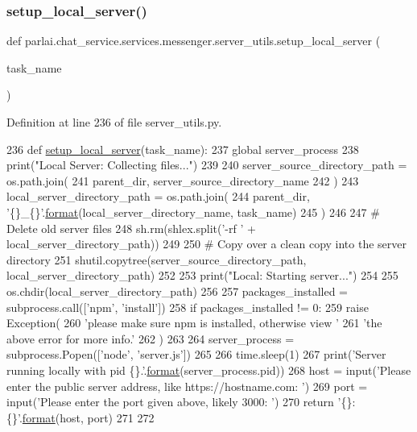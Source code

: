 \subsubsection{\texorpdfstring{setup\+\_\+local\+\_\+server()}{setup\_local\_server()}}
{\footnotesize\ttfamily def parlai.\+chat\+\_\+service.\+services.\+messenger.\+server\+\_\+utils.\+setup\+\_\+local\+\_\+server (\begin{DoxyParamCaption}\item[{}]{task\+\_\+name }\end{DoxyParamCaption})}



Definition at line 236 of file server\+\_\+utils.\+py.


\begin{DoxyCode}
236 \textcolor{keyword}{def }\hyperlink{namespaceparlai_1_1mturk_1_1core_1_1server__utils_a9d4c4937ea60bd74630a44739e825ebf}{setup\_local\_server}(task\_name):
237     \textcolor{keyword}{global} server\_process
238     print(\textcolor{stringliteral}{"Local Server: Collecting files..."})
239 
240     server\_source\_directory\_path = os.path.join(
241         parent\_dir, server\_source\_directory\_name
242     )
243     local\_server\_directory\_path = os.path.join(
244         parent\_dir, \textcolor{stringliteral}{'\{\}\_\{\}'}.\hyperlink{namespaceparlai_1_1chat__service_1_1services_1_1messenger_1_1shared__utils_a32e2e2022b824fbaf80c747160b52a76}{format}(local\_server\_directory\_name, task\_name)
245     )
246 
247     \textcolor{comment}{# Delete old server files}
248     sh.rm(shlex.split(\textcolor{stringliteral}{'-rf '} + local\_server\_directory\_path))
249 
250     \textcolor{comment}{# Copy over a clean copy into the server directory}
251     shutil.copytree(server\_source\_directory\_path, local\_server\_directory\_path)
252 
253     print(\textcolor{stringliteral}{"Local: Starting server..."})
254 
255     os.chdir(local\_server\_directory\_path)
256 
257     packages\_installed = subprocess.call([\textcolor{stringliteral}{'npm'}, \textcolor{stringliteral}{'install'}])
258     \textcolor{keywordflow}{if} packages\_installed != 0:
259         \textcolor{keywordflow}{raise} Exception(
260             \textcolor{stringliteral}{'please make sure npm is installed, otherwise view '}
261             \textcolor{stringliteral}{'the above error for more info.'}
262         )
263 
264     server\_process = subprocess.Popen([\textcolor{stringliteral}{'node'}, \textcolor{stringliteral}{'server.js'}])
265 
266     time.sleep(1)
267     print(\textcolor{stringliteral}{'Server running locally with pid \{\}.'}.\hyperlink{namespaceparlai_1_1chat__service_1_1services_1_1messenger_1_1shared__utils_a32e2e2022b824fbaf80c747160b52a76}{format}(server\_process.pid))
268     host = input(\textcolor{stringliteral}{'Please enter the public server address, like https://hostname.com: '})
269     port = input(\textcolor{stringliteral}{'Please enter the port given above, likely 3000: '})
270     \textcolor{keywordflow}{return} \textcolor{stringliteral}{'\{\}:\{\}'}.\hyperlink{namespaceparlai_1_1chat__service_1_1services_1_1messenger_1_1shared__utils_a32e2e2022b824fbaf80c747160b52a76}{format}(host, port)
271 
272 
\end{DoxyCode}
